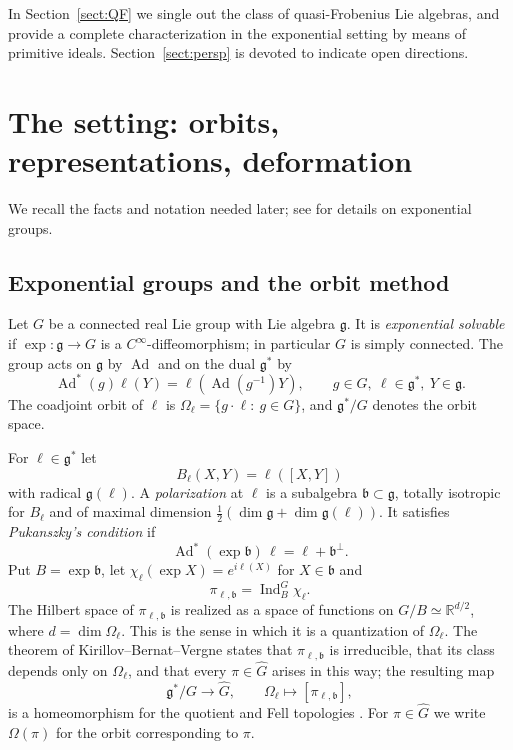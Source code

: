 \documentclass[11pt]{amsart}
\theoremstyle{plain}
\theoremstyle{definition}
\theoremstyle{remark}
\newcommand{\g}{\mathfrak g}
\newcommand{\bb}{\mathfrak b}
\newcommand{\RR}{\mathbb R}
\newcommand{\Ad}{\operatorname{Ad}}
\newcommand{\Ind}{\operatorname{Ind}}
\begin{document}
	
	
	
	In Section~\ref{sect:QF} we single out the  class of  quasi-Frobenius Lie algebras, and provide a complete characterization in the exponential setting by means of primitive ideals.   Section~\ref{sect:persp} is devoted to indicate open directions.
	
	\medskip
	
	
	\section{The setting: orbits, representations, deformation}\label{sect:setting}
	
	We recall the facts and notation needed later; see \cite{LL94} for details on exponential groups.
	
	\subsection{Exponential groups and the orbit method}
	
	Let $G$ be a connected real Lie group with Lie algebra $\g$. It is \emph{exponential solvable} if $\exp:\g\to G$ is a $C^\infty$-diffeomorphism; in particular $G$ is simply connected. The group acts on $\g$ by $\Ad$ and on the dual $\g^*$ by
	\[
	\Ad^*(g)\ell(Y)=\ell(\Ad(g^{-1})Y),\qquad g\in G,\ \ell\in\g^*,\ Y\in\g .
	\]
	The coadjoint orbit of $\ell$ is $\Omega_\ell=\{g\cdot\ell:\ g\in G\}$, and $\g^*/G$ denotes the orbit space.
	
	For $\ell\in\g^*$ let $$B_\ell(X,Y)=\ell([X,Y])$$ with radical $\g(\ell)$. A \emph{polarization} at $\ell$ is a subalgebra $\bb\subset\g$, totally isotropic for $B_\ell$ and of maximal dimension $\tfrac12(\dim\g+\dim\g(\ell))$. It satisfies \emph{Pukanszky's condition} if
	\[
	\Ad^*(\exp\bb)\,\ell=\ell+\bb^\perp .
	\]
	Put $B=\exp\bb$, let $\chi_\ell(\exp X)=e^{i\ell(X)}$ for $X\in\bb$ and
	\[
	\pi_{\ell,\bb}=\Ind_B^G\chi_\ell .
	\]
	The Hilbert space of $\pi_{\ell,\bb}$ is realized as a space of functions on $G/B\simeq\RR^{d/2}$, where $d=\dim\Omega_\ell$. This is the sense in which it is a quantization of $\Omega_\ell$. The theorem of Kirillov--Bernat--Vergne states that $\pi_{\ell,\bb}$ is irreducible, that its class depends only on $\Omega_\ell$, and that every $\pi\in\widehat G$ arises in this way; the resulting map
	\[
	\g^*/G\longrightarrow\widehat G,\qquad \Omega_\ell\longmapsto [\pi_{\ell,\bb}],
	\]
	is a homeomorphism for the quotient and Fell topologies \cite{LL94}. For $\pi\in\widehat G$ we write $\Omega(\pi)$ for the orbit corresponding to $\pi$.
	
\end{document}
